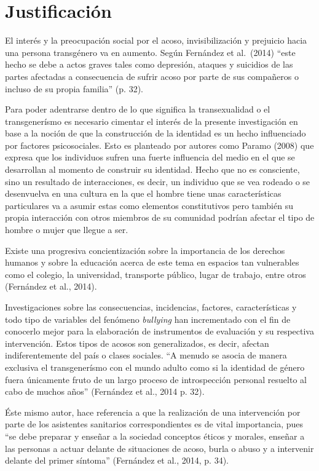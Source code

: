 \section{Justificación}

El interés y la preocupación social por el acoso, invisibilización y
prejuicio hacia una persona transgénero va en aumento.
Según Fernández et al.\ (2014) “este hecho se debe a actos graves tales como
depresión, ataques y suicidios de las partes afectadas a consecuencia de sufrir
acoso por parte de sus compañeros o incluso de su propia familia” (p. 32).

Para poder adentrarse dentro de lo que significa la transexualidad o el
transgenerísmo es necesario cimentar el interés de la presente investigación en
base a la noción de que la construcción de la identidad es un hecho influenciado
por factores psicosociales. Esto es planteado por autores como Paramo (2008) que
expresa que los individuos sufren una fuerte influencia del medio en el que se
desarrollan al momento de construir su identidad. Hecho que no es consciente,
sino un resultado de interacciones, es decir, un individuo que se vea rodeado o
se desenvuelva en una cultura en la que el hombre tiene unas características
particulares va a asumir estas como elementos constitutivos pero también su
propia interacción con otros miembros de su comunidad podrían afectar el tipo de
hombre o mujer que llegue a ser.

 Existe una progresiva concientización sobre la importancia de los derechos
 humanos y sobre la educación acerca de este tema en espacios tan vulnerables
 como el colegio, la universidad, transporte público, lugar de trabajo, entre
 otros (Fernández et al., 2014).

Investigaciones sobre las consecuencias, incidencias, factores, características
y todo tipo de variables del fenómeno \emph{bullying} han incrementado con el
fin de conocerlo mejor para la elaboración de instrumentos de evaluación y su
respectiva intervención. Estos tipos de acosos son generalizados, es decir,
afectan indiferentemente del país o clases sociales. “A menudo se asocia de
manera exclusiva el transgenerísmo con el mundo adulto como si la identidad de
género fuera únicamente fruto de un largo proceso de introspección personal
resuelto al cabo de muchos años” (Fernández et al., 2014 p. 32).

Éste mismo autor, hace referencia a que la realización de una intervención por
parte de los asistentes sanitarios correspondientes es de vital importancia,
pues “se debe preparar y enseñar a la sociedad conceptos éticos y morales,
enseñar a las personas a actuar delante de situaciones de acoso, burla o abuso y
a intervenir delante del primer síntoma” (Fernández et al., 2014, p. 34).

